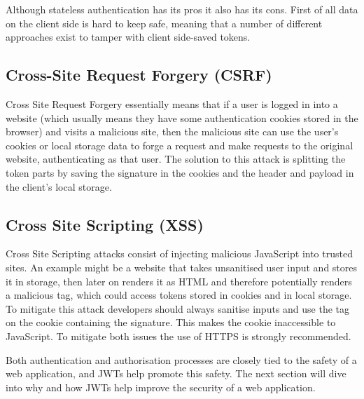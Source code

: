 Although stateless authentication has its pros it also has its cons. First of all data on the client side is hard to keep safe, meaning that a number of different approaches exist to tamper with client side-saved tokens. \cite{jwt-handbook}

\subsection{Cross-Site Request Forgery (CSRF)}
Cross Site Request Forgery essentially means that if a user is logged in into a website (which usually means they have some authentication cookies stored in the browser) and visits a malicious site, then the malicious site can use the user’s cookies or local storage data to forge a request and make requests to the original website, authenticating as that user. The solution to this attack is splitting the token parts by saving the signature in the cookies and the header and payload in the client's local storage. \cite{jwt-handbook}

\subsection{Cross Site Scripting (XSS)}
Cross Site Scripting attacks consist of injecting malicious JavaScript into trusted sites. An example might be a website that takes unsanitised user input and stores it in storage, then later on renders it as HTML and therefore potentially renders a malicious  tag, which could access tokens stored in cookies and in local storage. To mitigate this attack developers should always sanitise inputs and use the  tag on the cookie containing the signature. This makes the cookie inaccessible to JavaScript. To mitigate both issues the use of HTTPS is strongly recommended. \cite{jwt-handbook}

Both authentication and authorisation processes are closely tied to the safety of a web application, and JWTs help promote this safety. The next section will dive into why and how JWTs help improve the security of a web application.

